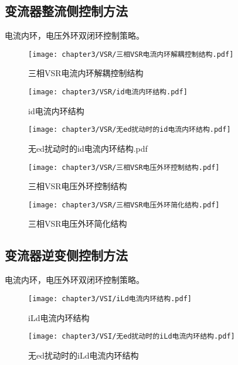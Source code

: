\subsection{变流器整流侧控制方法}

电流内环，电压外环双闭环控制策略。

\begin{figure}[!htp]
	\centering
	\texttt{[image: chapter3/VSR/三相VSR电流内环解耦控制结构.pdf]}
	\caption{三相VSR电流内环解耦控制结构}
	\label{fig:三相VSR电流内环解耦控制结构}
\end{figure}

\begin{figure}[!htp]
	\centering
	\texttt{[image: chapter3/VSR/id电流内环结构.pdf]}
	\caption{id电流内环结构}
	\label{fig:id电流内环结构}
\end{figure}

\begin{figure}[!htp]
	\centering
	\texttt{[image: chapter3/VSR/无ed扰动时的id电流内环结构.pdf]}
	\caption{无ed扰动时的id电流内环结构.pdf}
	\label{fig:无ed扰动时的id电流内环结构.pdf}
\end{figure}

\begin{figure}[!htp]
	\centering
	\texttt{[image: chapter3/VSR/三相VSR电压外环控制结构.pdf]}
	\caption{三相VSR电压外环控制结构}
	\label{fig:三相VSR电压外环控制结构}
\end{figure}

\begin{figure}[!htp]
	\centering
	\texttt{[image: chapter3/VSR/三相VSR电压外环简化结构.pdf]}
	\caption{三相VSR电压外环简化结构}
	\label{fig:三相VSR电压外环简化结构}
\end{figure}

\subsection{变流器逆变侧控制方法}

电流内环，电压外环双闭环控制策略。

\begin{figure}[!htp]
	\centering
	\texttt{[image: chapter3/VSI/iLd电流内环结构.pdf]}
	\caption{iLd电流内环结构}
	\label{fig:iLd电流内环结构}
\end{figure}

\begin{figure}[!htp]
	\centering
	\texttt{[image: chapter3/VSI/无ed扰动时的iLd电流内环结构.pdf]}
	\caption{无ed扰动时的iLd电流内环结构}
	\label{fig:无ed扰动时的iLd电流内环结构}
\end{figure}

